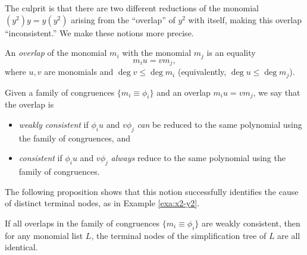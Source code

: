 The culprit is that there are two different reductions of the monomial $(y^2) y = y (y^2)$ arising from the ``overlap'' of $y^2$ with itself, making this overlap ``inconsistent.'' We make these notions more precise.
\begin{defn}\label{def:overlap}
	An \emph{overlap} of the monomial $m_i$ with the monomial $m_j$ is an equality
	\[
	m_i u = v m_j,
	\]
	where $u,v$ are monomials and $\deg v \leq \deg m_i$ (equivalently, $\deg u \leq \deg m_j$).
\end{defn}
\begin{defn}\label{def:consistent}
	Given a family of congruences $\{m_i \equiv \phi_i\}$ and an overlap $m_i u = v m_j$, we say that the overlap is
	\begin{itemize}
		\item \emph{weakly consistent} if $\phi_i u$ and $v \phi_j$ \emph{can} be reduced to the same polynomial using the family of congruences, and
		\item \emph{consistent} if $\phi_i u$ and $v \phi_j$ \emph{always} reduce to the same polynomial using the family of congruences.
	\end{itemize}
\end{defn}
The following proposition shows that this notion successfully identifies the cause of distinct terminal nodes, as in Example \ref{exa:x2-y2}.
\begin{prop}\label{prop:consistent-tree-terminals}
	If all overlaps in the family of congruences $\{m_i \equiv \phi_i\}$ are weakly consistent, then for any monomial list $L$, the terminal nodes of the simplification tree of $L$ are all identical.
\end{prop}
